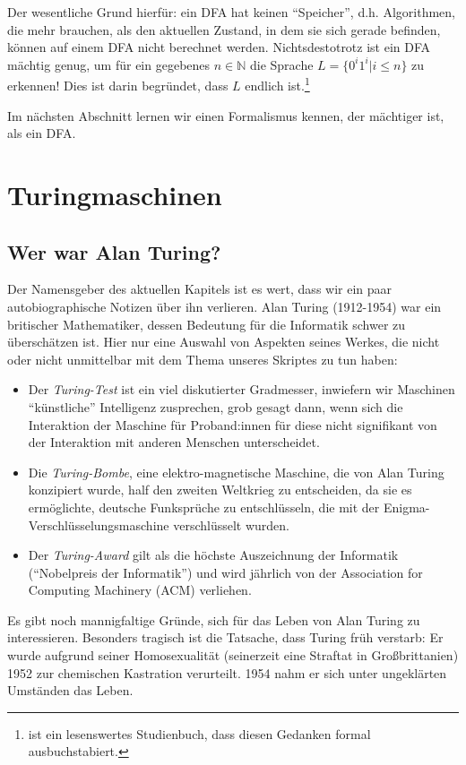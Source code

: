 Der wesentliche Grund hierfür: ein DFA hat keinen ``Speicher'',
d.h. Algorithmen, die mehr brauchen, als den aktuellen Zustand,
in dem sie sich gerade befinden,
können auf einem DFA nicht berechnet werden.
Nichtsdestotrotz ist ein DFA mächtig genug,
um für ein gegebenes $n \in \mathbb{N}$ die Sprache
$L = \{0^i1^i| i \leq n\}$ zu erkennen!
Dies ist darin begründet,
dass $L$ endlich ist.\footnote{
    \cite{aul} ist ein lesenswertes Studienbuch, dass diesen Gedanken formal ausbuchstabiert.
}

Im nächsten Abschnitt lernen wir einen Formalismus kennen,
der mächtiger ist, als ein DFA.

\section{Turingmaschinen}
\subsection{Wer war Alan Turing?}
Der Namensgeber des aktuellen Kapitels ist es wert,
dass wir ein paar autobiographische Notizen über ihn verlieren.
Alan Turing (1912-1954) war ein britischer Mathematiker,
dessen Bedeutung für die Informatik schwer zu überschätzen ist.
Hier nur eine Auswahl von Aspekten seines Werkes,
die nicht oder nicht unmittelbar mit dem Thema unseres Skriptes zu tun haben:
\begin{itemize}
    \item Der \emph{Turing-Test} ist ein viel diskutierter Gradmesser,
        inwiefern wir Maschinen ``künstliche'' Intelligenz zusprechen,
        grob gesagt dann, wenn sich die Interaktion der Maschine für Proband:innen
        für diese nicht signifikant von der Interaktion mit anderen Menschen unterscheidet.
    \item Die \emph{Turing-Bombe}, eine elektro-magnetische Maschine,
        die von Alan Turing konzipiert wurde,
        half den zweiten Weltkrieg zu entscheiden,
        da sie es ermöglichte,
        deutsche Funksprüche zu entschlüsseln,
        die mit der Enigma-Verschlüsselungsmaschine verschlüsselt wurden.
    \item Der \emph{Turing-Award} gilt als die höchste Auszeichnung der Informatik
        (``Nobelpreis der Informatik'') und wird jährlich von der
        Association for Computing Machinery (ACM) verliehen.
\end{itemize}
Es gibt noch mannigfaltige Gründe,
sich für das Leben von Alan Turing zu interessieren.
Besonders tragisch ist die Tatsache,
dass Turing früh verstarb:
Er wurde aufgrund seiner Homosexualität (seinerzeit eine Straftat in Großbrittanien)
1952 zur chemischen Kastration verurteilt.
1954 nahm er sich unter ungeklärten Umständen das Leben.

